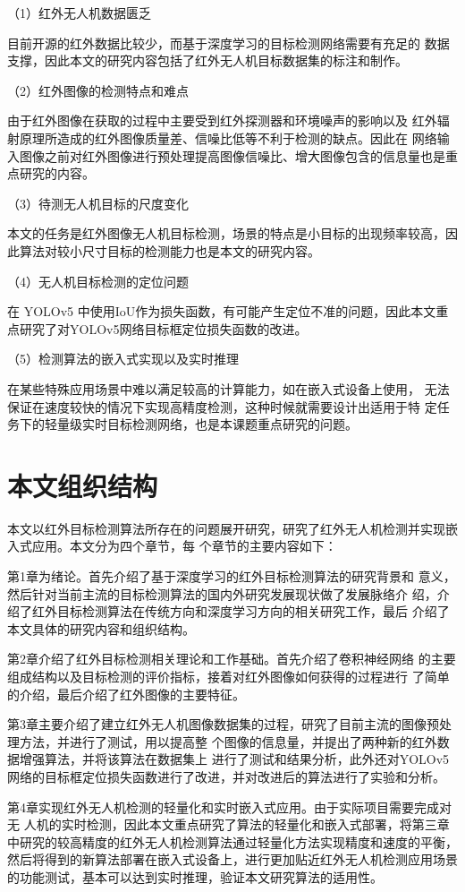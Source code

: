（1）红外无人机数据匮乏

目前开源的红外数据比较少，而基于深度学习的目标检测网络需要有充足的
数据支撑，因此本文的研究内容包括了红外无人机目标数据集的标注和制作。

（2）红外图像的检测特点和难点

由于红外图像在获取的过程中主要受到红外探测器和环境噪声的影响以及
红外辐射原理所造成的红外图像质量差、信噪比低等不利于检测的缺点。因此在
网络输入图像之前对红外图像进行预处理提高图像信噪比、增大图像包含的信息量也是重点研究的内容。

（3）待测无人机目标的尺度变化

本文的任务是红外图像无人机目标检测，场景的特点是小目标的出现频率较高，因此算法对较小尺寸目标的检测能力也是本文的研究内容。

（4）无人机目标检测的定位问题

在 YOLOv5 中使用IoU作为损失函数，有可能产生定位不准的问题，因此本文重点研究了对YOLOv5网络目标框定位损失函数的改进。

（5）检测算法的嵌入式实现以及实时推理

在某些特殊应用场景中难以满足较高的计算能力，如在嵌入式设备上使用，
无法保证在速度较快的情况下实现高精度检测，这种时候就需要设计出适用于特
定任务下的轻量级实时目标检测网络，也是本课题重点研究的问题。

\section{本文组织结构}
本文以红外目标检测算法所存在的问题展开研究，研究了红外无人机检测并实现嵌入式应用。本文分为四个章节，每
个章节的主要内容如下：

第1章为绪论。首先介绍了基于深度学习的红外目标检测算法的研究背景和
意义，然后针对当前主流的目标检测算法的国内外研究发展现状做了发展脉络介
绍，介绍了红外目标检测算法在传统方向和深度学习方向的相关研究工作，最后
介绍了本文具体的研究内容和组织结构。

第2章介绍了红外目标检测相关理论和工作基础。首先介绍了卷积神经网络
的主要组成结构以及目标检测的评价指标，接着对红外图像如何获得的过程进行
了简单的介绍，最后介绍了红外图像的主要特征。

第3章主要介绍了建立红外无人机图像数据集的过程，研究了目前主流的图像预处理方法，并进行了测试，用以提高整
个图像的信息量，并提出了两种新的红外数据增强算法，并将该算法在数据集上
进行了测试和结果分析，此外还对YOLOv5网络的目标框定位损失函数进行了改进，并对改进后的算法进行了实验和分析。

第4章实现红外无人机检测的轻量化和实时嵌入式应用。由于实际项目需要完成对无
人机的实时检测，因此本文重点研究了算法的轻量化和嵌入式部署，将第三章中研究的较高精度的红外无人机检测算法通过轻量化方法实现精度和速度的平衡，然后将得到的新算法部署在嵌入式设备上，进行更加贴近红外无人机检测应用场景的功能测试，基本可以达到实时推理，验证本文研究算法的适用性。

